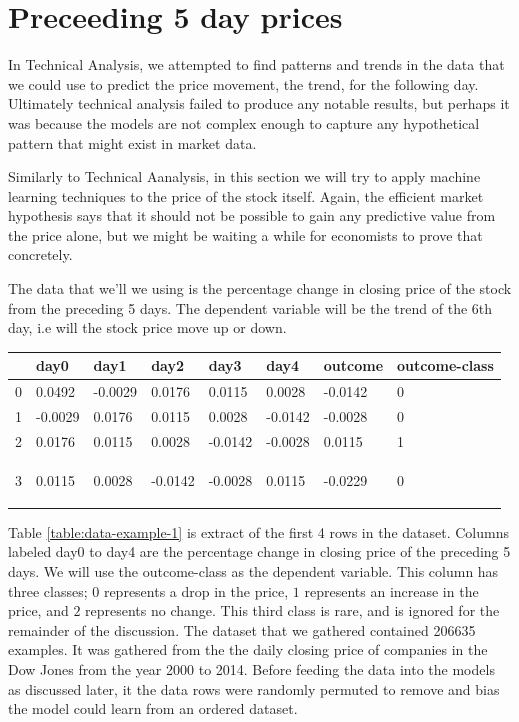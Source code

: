 \documentclass{report}
\begin{document}
\section{Preceeding 5 day prices}

In Technical Analysis, we attempted to find patterns and trends in the data that we could use to predict the price movement, the trend, for the following day. Ultimately technical analysis failed to produce any notable results, but perhaps it was because the models are not complex enough to capture any hypothetical pattern that might exist in market data.

Similarly to Technical Aanalysis, in this section we will try to apply machine learning techniques to the price of the stock itself. Again, the efficient market hypothesis says that it should not be possible to gain any predictive value from the price alone, but we might be waiting a while for economists to prove that concretely.

The data that we'll we using is the percentage change in closing price of the stock from the preceding 5 days. The dependent variable will be the trend of the 6th day, i.e will the stock price move up or down.

\begin{center}
    \begin{tabular}{l | l | l | l | l | l | l | l}
	& day0 & day1 &	day2 & day3 & day4 & outcome & outcome-class \\ \hline
0	& 0.0492 &	-0.0029 &	0.0176 &	0.0115 &	0.0028 &	-0.0142 &	0\\ \hline
1	& -0.0029 &	0.0176 &	0.0115 &	0.0028 & -0.0142 &	-0.0028 &	0\\ \hline
2	& 0.0176 &	0.0115 &	0.0028 &	-0.0142 & -0.0028 &	0.0115 &	1\\ \hline
3	& 0.0115 &	0.0028 &	-0.0142 &	-0.0028 &	0.0115 &	-0.0229 &	0

    \label{table:data-example-1}
    \end{tabular}
\end{center}

Table \ref{table:data-example-1} is extract of the first 4 rows in the dataset. Columns labeled day0 to day4 are the percentage change in closing price of the preceding 5 days. We will use the outcome-class as the dependent variable. This column has three classes; $0$ represents a drop in the price, $1$ represents an increase in the price, and $2$ represents no change. This third class is rare, and is ignored for the remainder of the discussion. The dataset that we gathered contained 206635 examples. It was gathered from the the daily closing price of companies in the Dow Jones from the year 2000 to 2014. Before feeding the data into the models as discussed later, it the data rows were randomly permuted to remove and bias the model could learn from an ordered dataset.
\end{document}
